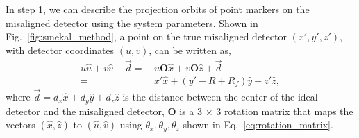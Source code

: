 In step 1, we can describe the projection orbits of point markers on the misaligned detector using the system parameters.  Shown in Fig.~\ref{fig:smekal_method}, a point on the true misaligned detector $(x', y', z')$, with detector coordinates $(u, v)$, can be written as,
%
\begin{equation}
\begin{aligned}
u \hat{u} + v \hat{v} + \vec{d} =& \, u \mathrm{\mathbf{O}} \hat{x} + v \mathrm{\mathbf{O}} \hat{z} + \vec{d} \\
								=& \, x' \hat{x} + (y' - R + R_f) \hat{y} + z' \hat{z},
\end{aligned}
\label{eq:projection_orbit}
\end{equation}
%
where $\vec{d} = d_x \hat{x} + d_y \hat{y} + d_z \hat{z}$ is the distance between the center of the ideal detector and the misaligned detector, $\mathrm{\mathbf{O}}$ is a 3 $\times$ 3 rotation matrix that maps the vectors $(\hat{x}, \hat{z})$ to $(\hat{u}, \hat{v})$ using $\theta_x, \theta_y, \theta_z$ shown in Eq.~\ref{eq:rotation_matrix}.
%


